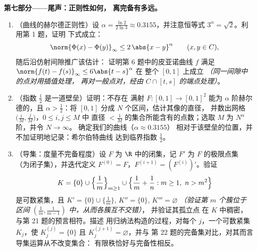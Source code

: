 \begin{problem}
\medskip
\noindent\textbf{第七部分——尾声：正则性如何，
离完备有多远。}
\begin{enumerate}[resume]
  \item （曲线的赫尔德正则性）设 $\alpha =
        \frac{\ln 2}{2\ln 3} \approx 0.3155$，并注意恒等式
        $3^\alpha = \sqrt2$。利用第 1 题，证明
        下式成立：
        \[
        \norm{\Phi(x) - \Phi(y)}_\infty \leq 2\,\abs{x -
        y}^\alpha \qquad (x, y \in C),
        \]
        随后沿仿射间隙推广该估计：
        证明第 6 题中的皮亚诺曲线 $f$ 满足
        $\norm{f(t) - f(s)}_\infty \leq 6\abs{t - s}^\alpha$ 在
        整个 $[0,1]$ 上成立 \emph{（同一间隙中的点对用插值处理，
        再对一般点对，经由
        $C \cap [t, s]$ 的端点处理）}。
  \item （指数 $\frac12$ 是一道壁垒）证明：不存在
        满射 $F \colon [0,1] \to [0,1]^2$ 能为
        $\alpha$ 阶赫尔德的，且 $\alpha > \frac12$：将 $[0,1]$
        分成 $N$ 个区间，估计其像的直径，
        并数出网格
        $\bigl(\frac iM, \frac jM\bigr)$，$0 \leq i, j \leq M$ 中
        直径 $< \frac1M$ 的集合所能含有的点数；选取
        $M$ 为 $N^\alpha$ 阶，并令 $N \to \infty$。
        确定我们的曲线（$\alpha \approx 0.3155$）
        相对于该壁垒的位置，并不加证明地记录：希尔伯特曲线
        达到临界指数 $\frac12$。
  \item （导集：度量不完备程度）设 $F$
        为 $\R$ 中的闭集，记 $F'$ 为 $F$ 的极限点集
        （为闭子集），并迭代定义 $F^{(0)} = F$，$F^{(i+1)}
        = (F^{(i)})'$。验证
        \[
        K = \{0\} \cup \Bigl\{\frac1m\Bigr\}_{m \geq 1} \cup
        \Bigl\{\frac1m + \frac1n : m \geq 1,\ n > m^2\Bigr\}
        \]
        是可数紧集，且 $K' = \{0\} \cup
        \{\frac1m\}$, $K'' = \{0\}$, $K''' = \varnothing$
        \emph{（验证第 $m$ 个簇位于
        区间 $(\frac1m, \frac1{m-1})$ 中，从而各簇互不交错）}，
        并验证其孤立点
        在 $K$ 中稠密，与第 21 题的预言相符。描述
        用归纳法构造的过程，对每个 $j$，一个可数紧集
        $K_j$，使 $K_j^{(j)} = \{0\}$ 且 $K_j^{(j+1)} =
        \varnothing$，并与
        第 22 题的完备集对比，对其而言导集运算从不改变集合：
        有限秩恰好与完备性相反。
\end{enumerate}
\end{problem}
